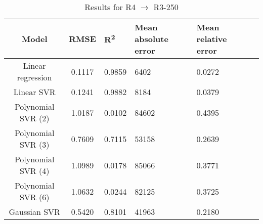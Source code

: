 \begin{table}[H]
\centering
\begin{adjustbox}{center}
\begin{tabular}{c | c M{1.2cm} M{2.5cm} M{2.5cm} M{1.8cm}}
Model & RMSE & R\textsuperscript{2} & Mean absolute error & Mean relative error \tabularnewline
\hline
Linear regression & 0.1117 & 0.9859 &   6402 & 0.0272 \\
Linear SVR & 0.1241 & 0.9882 &   8184 & 0.0379 \\
Polynomial SVR (2) & 1.0187 & 0.0102 &  84602 & 0.4395 \\
Polynomial SVR (3) & 0.7609 & 0.7115 &  53158 & 0.2639 \\
Polynomial SVR (4) & 1.0989 & 0.0178 &  85066 & 0.3771 \\
Polynomial SVR (6) & 1.0632 & 0.0244 &  82125 & 0.3725 \\
Gaussian SVR & 0.5420 & 0.8101 &  41963 & 0.2180 \\
\end{tabular}
\end{adjustbox}
\\
\caption{Results for R4 $\rightarrow$ R3-250}
\label{tab:coreonly_linear_R4_R3_250}
\end{table}
